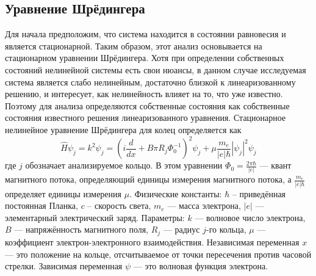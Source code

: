 \documentclass[A4,12pt,oneside]{article}
\renewcommand{\(}{\left(}
\renewcommand{\)}{\right)}
\begin{document}
\subsection{Уравнение Шрёдингера}
Для начала предположим, что система находится в состоянии равновесия и является стационарной. Таким образом, этот анализ основывается на стационарном уравнении Шрёдингера. Хотя при определении собственных состояний нелинейной системы есть свои нюансы, в данном случае исследуемая система является слабо нелинейным, достаточно близкой к линеаризованному решению, и интересует, как нелинейность влияет на то, что уже известно. Поэтому для анализа определяются собственные состояния как собственные состояния известного решения линеаризованного уравнения. 
Стационарное нелинейное уравнение Шрёдингера для колец определяется как
\begin{equation}
\hat{H} \psi_j = k^2 \psi_j = \left(i\frac{d}{dx}+B\pi R_j \Phi_0^{-1}\right)^2\psi_j + \mu \frac{m_e}{\left|e\right| \hbar}\left|\psi_j\right|^2\psi_j
\end{equation}
где $j$ обозначает анализируемое кольцо. В этом уравнении 
$\Phi_0=\frac{2 \pi \hbar}{\left|e\right|}$ — квант магнитного потока, определяющий единицы измерения магнитного потока, а $\frac{m_e}{\left|e\right| \hbar}$ определяет единицы измерения $\mu$.
Физические константы: $\hbar$ -- приведённая постоянная Планка, $c$ -- скорость света, $m_e$ — масса электрона, $\left|e\right|$ — элементарный электрический заряд. Параметры: $k$ — волновое число электрона, $B$ — напряжённость магнитного поля, $R_j$ — радиус $j$-го кольца, $\mu$ — коэффициент электрон-электронного взаимодействия. Независимая переменная $x$ — это положение на кольце, отсчитываемое от точки пересечения против часовой стрелки. Зависимая переменная $\psi$ — это волновая функция электрона.
\end{document}
